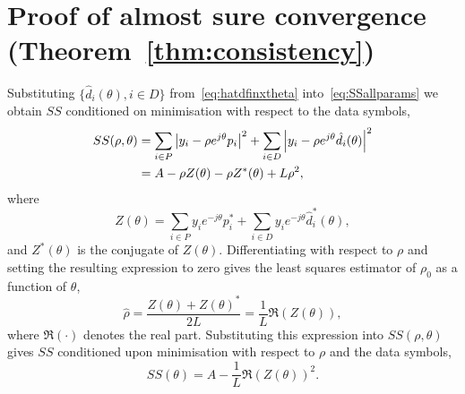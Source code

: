 \documentclass[journal]{IEEEtran}
\begin{document}
\section{Proof of almost sure convergence (Theorem~\ref{thm:consistency}) } \label{sec:proof-almost-sure}

Substituting $\{ \hat{d}_i(\theta), i \in D \}$ from~\eqref{eq:hatdfinxtheta} into~\eqref{eq:SSallparams} we obtain $SS$ conditioned on minimisation with respect to the data symbols,
 \begin{align*}
SS(\rho, \theta) &=\sum_{i \in P} {\left\vert  y_i - \rho e^{j\theta} p_i  \right\vert}^2 + \sum_{i \in D} {\left\vert  y_i - \rho e^{j\theta} \hat{d_i}(\theta)  \right\vert}^2 \\
&= A - \rho Z(\theta) - \rho Z^*(\theta) + L \rho^2,
\end{align*}
where
\[
Z(\theta)  = \sum_{i \in P} y_i e^{-j\theta} p_i^* + \sum_{i \in D} y_i e^{-j\theta} \hat{d}_i^*(\theta),
\]
and $Z^*(\theta)$ is the conjugate of $Z(\theta)$.  Differentiating with respect to $\rho$ and setting the resulting expression to zero gives the least squares estimator of $\rho_0$ as a function of $\theta$, 
\begin{equation}\label{eq:hatrhoZ}
\hat{\rho} = \frac{Z(\theta) + Z(\theta)^*}{2L} = \frac{1}{L}\Re(Z(\theta)),
\end{equation}
where $\Re(\cdot)$ denotes the real part.  Substituting this expression into $SS(\rho, \theta)$ gives $SS$ conditioned upon minimisation with respect to $\rho$ and the data symbols,
\[
SS(\theta) = A - \frac{1}{L}\Re(Z(\theta))^2.
\]
\end{document}
